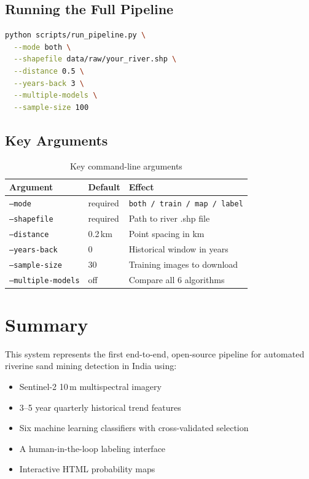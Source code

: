 \documentclass[12pt, a4paper]{article}
\begin{document}
\subsection{Running the Full Pipeline}

\begin{lstlisting}[language=bash, caption=Full pipeline command]
python scripts/run_pipeline.py \
  --mode both \
  --shapefile data/raw/your_river.shp \
  --distance 0.5 \
  --years-back 3 \
  --multiple-models \
  --sample-size 100
\end{lstlisting}

\subsection{Key Arguments}

\begin{table}[H]
\centering
\begin{tabular}{lll}
\toprule
\textbf{Argument} & \textbf{Default} & \textbf{Effect} \\
\midrule
\texttt{--mode} & required & \texttt{both / train / map / label} \\
\texttt{--shapefile} & required & Path to river .shp file \\
\texttt{--distance} & 0.2\,km & Point spacing in km \\
\texttt{--years-back} & 0 & Historical window in years \\
\texttt{--sample-size} & 30 & Training images to download \\
\texttt{--multiple-models} & off & Compare all 6 algorithms \\
\bottomrule
\end{tabular}
\caption{Key command-line arguments}
\end{table}

\section{Summary}

This system represents the first end-to-end, open-source pipeline
for automated riverine sand mining detection in India using:
\begin{itemize}[noitemsep]
  \item Sentinel-2 10\,m multispectral imagery
  \item 3--5 year quarterly historical trend features
  \item Six machine learning classifiers with cross-validated selection
  \item A human-in-the-loop labeling interface
  \item Interactive HTML probability maps
\end{itemize}
\end{document}
